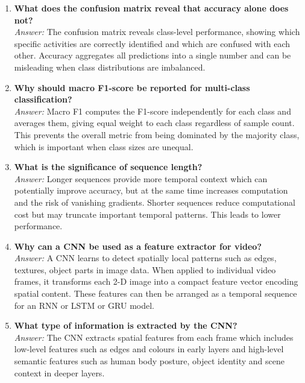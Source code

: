 \documentclass[10pt]{article}
\begin{document}
\begin{enumerate}
\item \textbf{What does the confusion matrix reveal that accuracy alone does not?}\\
\textit{Answer:} The confusion matrix reveals class-level performance, showing which specific activities are correctly identified and which are confused with each other. Accuracy aggregates all predictions into a single number and can be misleading when class distributions are imbalanced.\\
\vspace{8mm}

\item \textbf{Why should macro F1-score be reported for multi-class classification?}\\
\textit{Answer:} Macro F1 computes the F1-score independently for each class and averages them, giving equal weight to each class regardless of sample count. This prevents the overall metric from being dominated by the majority class, which is important when class sizes are unequal.\\
\vspace{8mm}

\item \textbf{What is the significance of sequence length?}\\
\textit{Answer:} Longer sequences provide more temporal context which can potentially improve accuracy, but at the same time increases computation and the risk of vanishing gradients. Shorter sequences reduce computational cost but may truncate important temporal patterns. This leads to lower performance.\\
\vspace{8mm}

\item \textbf{Why can a CNN be used as a feature extractor for video?}\\
\textit{Answer:} A CNN learns to detect spatially local patterns such as edges, textures, object parts in image data. When applied to individual video frames, it transforms each 2-D image into a compact feature vector encoding spatial content. These features can then be arranged as a temporal sequence for an RNN or LSTM or GRU model.\\
\vspace{8mm}

\item \textbf{What type of information is extracted by the CNN?}\\
\textit{Answer:} The CNN extracts spatial features from each frame which includes low-level features such as edges and colours in early layers and high-level semantic features such as human body posture, object identity and scene context in deeper layers.\\
\vspace{8mm}


\end{enumerate}
\end{document}
